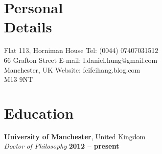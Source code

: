 \documentclass[margin,line]{resume}
\begin{document}
\begin{resume}
    \section{\mysidestyle Personal\\Details}

    Flat 113, Horniman House    \hfill Tel: (0044) 07407031512         \vspace{0mm}\\\vspace{0mm}%
    66 Grafton Street           \hfill E-mail: l.daniel.hung@gmail.com \vspace{0mm}\\\vspace{0mm}%
    Manchester, UK              \hfill Website: feifeihang.blog.com    \vspace{0mm}\\\vspace{-4.5mm}%
    M13 9NT                     \vspace{1em}


    \section{\mysidestyle Education}
    \textbf{University of Manchester}, United Kingdom \vspace{2mm}\\\vspace{1mm}%
    \textsl{Doctor of Philosophy} \hfill \textbf{2012 -- present} \vspace{-1.5mm}


\end{resume}
\end{document}
